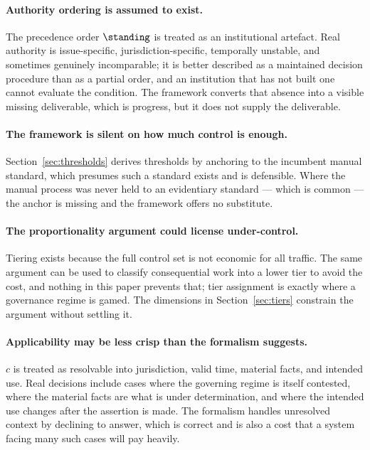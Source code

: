 \paragraph{Authority ordering is assumed to exist.} The precedence order $\standing$ is
treated as an institutional artefact. Real authority is issue-specific,
jurisdiction-specific, temporally unstable, and sometimes genuinely incomparable; it is
better described as a maintained decision procedure than as a partial order, and an
institution that has not built one cannot evaluate the condition. The framework converts
that absence into a visible missing deliverable, which is progress, but it does not
supply the deliverable.

\paragraph{The framework is silent on how much control is enough.}
Section~\ref{sec:thresholds} derives thresholds by anchoring to the incumbent manual
standard, which presumes such a standard exists and is defensible. Where the manual
process was never held to an evidentiary standard --- which is common --- the anchor is
missing and the framework offers no substitute.

\paragraph{The proportionality argument could license under-control.} Tiering exists
because the full control set is not economic for all traffic. The same argument can be
used to classify consequential work into a lower tier to avoid the cost, and nothing in
this paper prevents that; tier assignment is exactly where a governance regime is
gamed. The dimensions in Section~\ref{sec:tiers} constrain the argument without settling
it.

\paragraph{Applicability may be less crisp than the formalism suggests.} $c$ is treated
as resolvable into jurisdiction, valid time, material facts, and intended use. Real
decisions include cases where the governing regime is itself contested, where the
material facts are what is under determination, and where the intended use changes after
the assertion is made. The formalism handles unresolved context by declining to answer,
which is correct and is also a cost that a system facing many such cases will pay
heavily.

